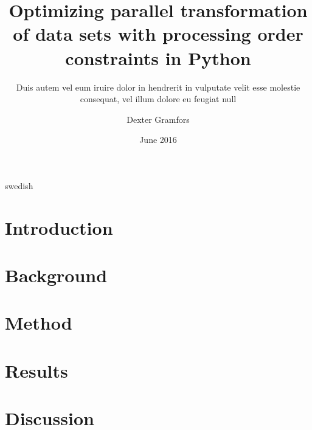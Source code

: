 \documentclass[a4paper,11pt,openany]{kth-mag}
\title{Optimizing parallel transformation of data sets with processing order constraints in Python}
\subtitle{Duis autem vel eum iruire dolor in hendrerit in
          vulputate velit esse molestie consequat, vel illum
          dolore eu feugiat null}
\author{Dexter Gramfors}
\date{June 2016}
\begin{document}
\frontmatter
\pagestyle{empty}
\removepagenumbers
\maketitle
{}
\begin{abstract}
    
\end{abstract}
\clearpage
\begin{foreignabstract}{swedish}
    
\end{foreignabstract}
\clearpage
\tableofcontents*
\clearpage
\listoffigures
\mainmatter
\pagestyle{newchap}
\chapter{Introduction}
    
\chapter{Background}
    
\chapter{Method}
    
\chapter{Results}
    
\chapter{Discussion}
    
    
\nocite{*}
\printbibliography

\addappheadtotoc



\end{document}
